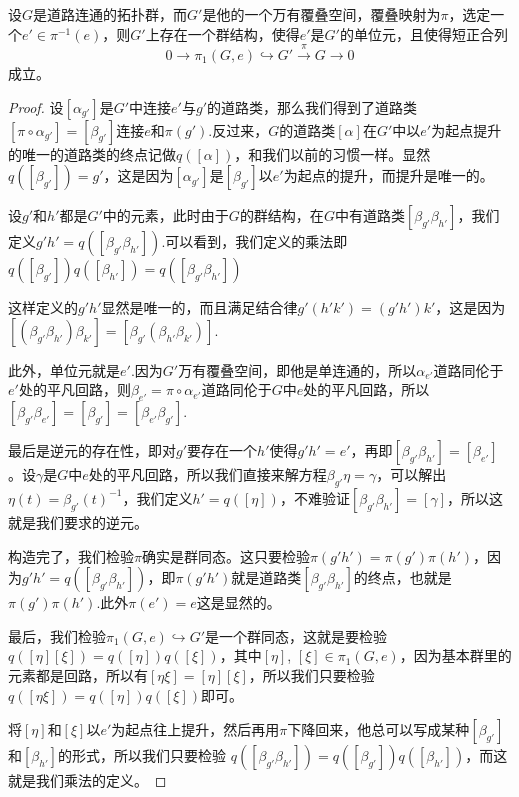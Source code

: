 \begin{thm}
设$G$是道路连通的拓扑群，而$G'$是他的一个万有覆叠空间，覆叠映射为$\pi$，选定一个$e'\in \pi^{-1}(e)$，则$G'$上存在一个群结构，使得$e'$是$G'$的单位元，且使得短正合列
\[
	0\to \pi_1(G,e)\hookrightarrow G' \xrightarrow{\pi} G\to 0
\]
成立。
\end{thm}

\begin{proof}
设$[\alpha_{g'}]$是$G'$中连接$e'$与$g'$的道路类，那么我们得到了道路类$[\pi\circ \alpha_{g'}]=[\beta_{g'}]$连接$e$和$\pi(g')$.反过来，$G$的道路类$[\alpha]$在$G'$中以$e'$为起点提升的唯一的道路类的终点记做$q([\alpha])$，和我们以前的习惯一样。显然$q([\beta_{g'}])=g'$，这是因为$[\alpha_{g'}]$是$[\beta_{g'}]$以$e'$为起点的提升，而提升是唯一的。

设$g'$和$h'$都是$G'$中的元素，此时由于$G$的群结构，在$G$中有道路类$[\beta_{g'}\beta_{h'}]$，我们定义$g'h'=q([\beta_{g'}\beta_{h'}])$.可以看到，我们定义的乘法即$q([\beta_{g'}])q([\beta_{h'}])=q([\beta_{g'}\beta_{h'}])$

这样定义的$g'h'$显然是唯一的，而且满足结合律$g'(h'k')=(g'h')k'$，这是因为$[(\beta_{g'}\beta_{h'})\beta_{k'}]=[\beta_{g'}(\beta_{h'}\beta_{k'})]$.

此外，单位元就是$e'$.因为$G'$万有覆叠空间，即他是单连通的，所以$\alpha_{e'}$道路同伦于$e'$处的平凡回路，则$\beta_{e'}=\pi\circ \alpha_{e'}$道路同伦于$G$中$e$处的平凡回路，所以$[\beta_{g'}\beta_{e'}]=[\beta_{g'}]=[\beta_{e'}\beta_{g'}]$.

最后是逆元的存在性，即对$g'$要存在一个$h'$使得$g'h'=e'$，再即$[\beta_{g'}\beta_{h'}]=[\beta_{e'}]$。设$\gamma$是$G$中$e$处的平凡回路，所以我们直接来解方程$\beta_{g'}\eta=\gamma$，可以解出$\eta(t)=\beta_{g'}(t)^{-1}$，我们定义$h'=q([\eta])$，不难验证$[\beta_{g'}\beta_{h'}]=[\gamma]$，所以这就是我们要求的逆元。

构造完了，我们检验$\pi$确实是群同态。这只要检验$\pi(g'h')=\pi(g')\pi(h')$，因为$g'h'=q([\beta_{g'}\beta_{h'}])$，即$\pi(g'h')$就是道路类$[\beta_{g'}\beta_{h'}]$的终点，也就是$\pi(g')\pi(h')$.此外$\pi(e')=e$这是显然的。

最后，我们检验$\pi_1(G,e)\hookrightarrow G'$是一个群同态，这就是要检验$q([\eta][\xi])=q([\eta])q([\xi])$，其中$[\eta]$, $[\xi]\in \pi_1(G,e)$，因为基本群里的元素都是回路，所以有$[\eta\xi]=[\eta][\xi]$，所以我们只要检验$q([\eta\xi])=q([\eta])q([\xi])$即可。

将$[\eta]$和$[\xi]$以$e'$为起点往上提升，然后再用$\pi$下降回来，他总可以写成某种$[\beta_{g'}]$和$[\beta_{h'}]$的形式，所以我们只要检验
$q([\beta_{g'}\beta_{h'}])=q([\beta_{g'}])q([\beta_{h'}])$，而这就是我们乘法的定义。
\end{proof}

